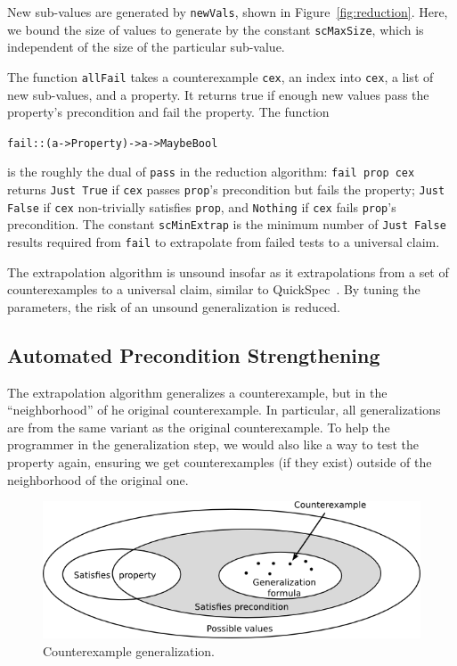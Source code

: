 \documentclass[10pt]{sigplanconf}
\newenvironment{code}{\begin{alltt}}{\end{alltt}}
\newcommand{\ttp}[1]{\texttt{#1}}
\begin{document}
New sub-values are generated by \ttp{newVals}, shown in
Figure~\ref{fig:reduction}.  Here, we bound the size of values to generate by
the constant \ttp{scMaxSize}, which is independent of the size of the particular
sub-value.

The function \ttp{allFail} takes a counterexample \ttp{cex}, an index into
\ttp{cex}, a list of new sub-values, and a property.  It returns true if enough
new values pass the property's precondition and fail the property.  The function
%
\begin{code}
fail :: (a -> Property) -> a -> Maybe Bool
\end{code}
%
\noindent
is the roughly the dual of \ttp{pass} in the reduction algorithm: \ttp{fail prop
  cex} returns \ttp{Just True} if \ttp{cex} passes \ttp{prop}'s precondition but
fails the property; \ttp{Just False} if \ttp{cex} non-trivially satisfies
\ttp{prop}, and \ttp{Nothing} if \ttp{cex} fails \ttp{prop}'s precondition.  The
constant \ttp{scMinExtrap} is the minimum number of \ttp{Just False} results
required from \ttp{fail} to extrapolate from failed tests to a universal claim.

The extrapolation algorithm is unsound insofar as it extrapolations from a set
of counterexamples to a universal claim, similar to QuickSpec~\cite{qs}.  By
tuning the parameters, the risk of an unsound generalization is reduced.

\subsection{Automated Precondition Strengthening}
The extrapolation algorithm generalizes a counterexample, but in the
``neighborhood'' of he original counterexample.  In particular, all
generalizations are from the same variant as the original counterexample.  To
help the programmer in the generalization step, we would also like a way to test
the property again, ensuring we get counterexamples (if they exist) outside of
the neighborhood of the original one.

\begin{figure}[ht!]
  \begin{center}
    \includegraphics[scale=0.5]{Figs/cex-gen}
   \end{center}
  \caption{Counterexample generalization.}
  \label{fig:cex-gen}
\end{figure}
\end{document}
